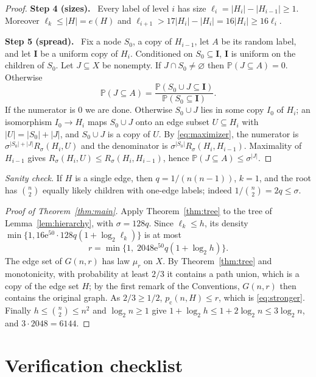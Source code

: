 \documentclass[11pt]{article}
\numberwithin{equation}{section}
\newcommand{\PP}{\mathbb P}
\newcommand{\pc}{p_{\mathrm c}}
\newcommand{\ee}{\mathrm e}
\newcommand{\step}[1]{\par\smallskip\noindent\textbf{Step #1.}\ }
\begin{document}
\begin{proof}
\step{4 (sizes)} Every label of level $i$ has size
$\ell_i=|H_i|-|H_{i-1}|\ge1$. Moreover $\ell_k\le|H|=e(H)$ and
$\ell_{i+1}>17|H_i|-|H_i|=16|H_i|\ge16\ell_i$.

\step{5 (spread)} Fix a node $S_0$, a copy of $H_{i-1}$, let $A$ be its
random label, and let $\boldsymbol I$ be a uniform copy of $H_i$.
Conditioned on $S_0\subseteq\boldsymbol I$, $\boldsymbol I$ is uniform on
the children of $S_0$. Let $J\subseteq X$ be nonempty. If
$J\cap S_0\ne\varnothing$ then $\PP(J\subseteq A)=0$. Otherwise
\begin{equation}\label{eq:conditional-ratio}
 \PP(J\subseteq A)=
 \frac{\PP(S_0\cup J\subseteq\boldsymbol I)}
      {\PP(S_0\subseteq\boldsymbol I)}.
\end{equation}
If the numerator is $0$ we are done. Otherwise $S_0\cup J$ lies in some
copy $I_0$ of $H_i$; an isomorphism $I_0\to H_i$ maps $S_0\cup J$ onto an
edge subset $U\subseteq H_i$ with $|U|=|S_0|+|J|$, and $S_0\cup J$ is a
copy of $U$. By \eqref{eq:maximizer}, the numerator is
$\sigma^{|S_0|+|J|}R_\sigma(H_i,U)$ and the denominator is
$\sigma^{|S_0|}R_\sigma(H_i,H_{i-1})$. Maximality of $H_{i-1}$ gives
$R_\sigma(H_i,U)\le R_\sigma(H_i,H_{i-1})$, hence
$\PP(J\subseteq A)\le\sigma^{|J|}$.
\end{proof}

\emph{Sanity check.} If $H$ is a single edge, then $q=1/(n(n-1))$, $k=1$,
and the root has $\binom n2$ equally likely children with one-edge
labels; indeed $1/\binom n2=2q\le\sigma$.

\begin{proof}[Proof of Theorem~\ref{thm:main}]
Apply Theorem~\ref{thm:tree} to the tree of Lemma~\ref{lem:hierarchy},
with $\sigma=128q$. Since $\ell_k\le h$, its density
$\min\{1,16\ee^{50}\cdot128q(1+\log_2\ell_k)\}$ is at most
\[
 r=\min\{1,\;2048\ee^{50}q(1+\log_2h)\}.
\]
The edge set of $G(n,r)$ has law $\mu_r$ on $X$. By
Theorem~\ref{thm:tree} and monotonicity, with probability at least $2/3$
it contains a path union, which is a copy of the edge set $H$; by the
first remark of the Conventions, $G(n,r)$ then contains the original
graph. As $2/3\ge1/2$, $\pc(n,H)\le r$, which is \eqref{eq:stronger}.
Finally $h\le\binom n2\le n^2$ and $\log_2n\ge1$ give
$1+\log_2h\le1+2\log_2n\le3\log_2n$, and $3\cdot2048=6144$.
\end{proof}

\section*{Verification checklist}
\end{document}
